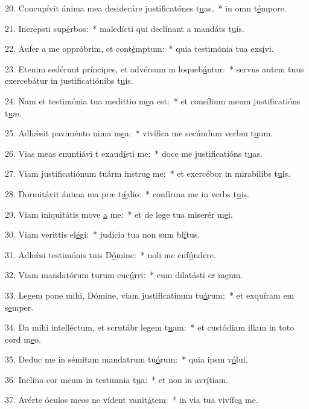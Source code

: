 20. Concupívit ánima mea desideráre justificatónes t\uline{u}as,~* in omn t\uline{é}mpore.\par 
21. Increpsti sup\uline{é}rbos:~* maledícti qui declínant a mandáts t\uline{u}is.\par 
22. Aufer a me oppróbrim, et cont\uline{é}mptum:~* quia testimónia tua exs\uline{í}vi.\par 
23. Etenim sedérunt príncipes, et advérsum m loqueb\uline{á}ntur:~* servus autem tuus exercebátur in justificatiónibs t\uline{u}is.\par 
24. Nam et testimónia tua medittio m\uline{e}a est:~* et consílium meum justificatións t\uline{u}æ.\par 
25. Adhǽsit paviménto nima m\uline{e}a:~* vivífica me secúndum verbm t\uline{u}um.\par 
26. Vias meas enuntiávi t exaud\uline{í}sti me:~* doce me justificatións t\uline{u}as.\par 
27. Viam justificatiónum tuárm ínstru\uline{e} me:~* et exercébor in mirabílibs t\uline{u}is.\par 
28. Dormitávit ánima ma præ t\uline{ǽ}dio:~* confírma me in verbs t\uline{u}is.\par 
29. Viam iniquitátis move \uline{a} me:~* et de lege tua miserér m\uline{e}i.\par 
30. Viam verittis el\uline{é}gi:~* judícia tua non sum bl\uline{í}tus.\par 
31. Adhǽsi testimónis tuis D\uline{ó}mine:~* noli me cnf\uline{ú}ndere.\par 
32. Viam mandatórum turum cuc\uline{ú}rri:~* cum dilatásti cr m\uline{e}um.\par 
33. Legem pone mihi, Dómine, viam justificatinum tu\uline{á}rum:~* et exquíram em s\uline{e}mper.\par 
34. Da mihi intelléctum, et scrutábr legem t\uline{u}am:~* et custódiam illam in toto cord m\uline{e}o.\par 
35. Deduc me in sémitam mandatrum tu\uline{ó}rum:~* quia ipsm v\uline{ó}lui.\par 
36. Inclína cor meum in testimnia t\uline{u}a:~* et non in avr\uline{í}tiam.\par 
37. Avérte óculos meos ne vídent vanit\uline{á}tem:~* in via tua vivífc\uline{a} me.\par 
